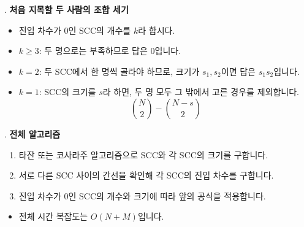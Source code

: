\begin{frame}{\textbf{\pletter}. \ptitle}
    \textbf{처음 지목할 두 사람의 조합 세기}
    \begin{itemize}
        \item 진입 차수가 $0$인 SCC의 개수를 $k$라 합시다.
        \item $k\ge3$: 두 명으로는 부족하므로 답은 $0$입니다.
        \item $k=2$: 두 SCC에서 한 명씩 골라야 하므로, 크기가 $s_1,s_2$이면 답은 $s_1s_2$입니다.
        \item $k=1$: SCC의 크기를 $s$라 하면, 두 명 모두 그 밖에서 고른 경우를 제외합니다.
        \[
            \boxed{\binom{N}{2}-\binom{N-s}{2}}
        \]
    \end{itemize}
\end{frame}

\begin{frame}{\textbf{\pletter}. \ptitle}
    \textbf{전체 알고리즘}
    \begin{enumerate}
        \item 타잔 또는 코사라주 알고리즘으로 SCC와 각 SCC의 크기를 구합니다.
        \item 서로 다른 SCC 사이의 간선을 확인해 각 SCC의 진입 차수를 구합니다.
        \item 진입 차수가 $0$인 SCC의 개수와 크기에 따라 앞의 공식을 적용합니다.
    \end{enumerate}
    \begin{itemize}
        \item 전체 시간 복잡도는 $O(N+M)$입니다.
    \end{itemize}
\end{frame}
